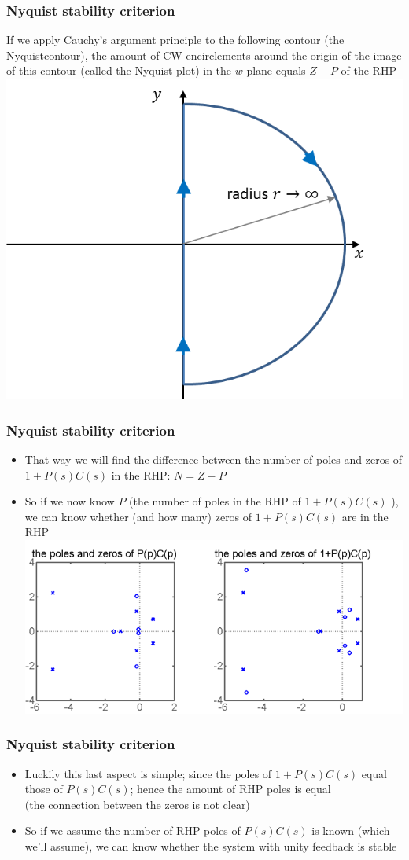 \begin{frame}
\frametitle{Nyquist stability criterion}
 If we apply Cauchy’s argument principle to the following contour (the Nyquistcontour), the amount of CW encirclements around the origin of the image of this contour (called the Nyquist plot) in the $w$-plane equals $Z-P$ of the RHP\\
\includegraphics[width=0.7\linewidth]{Afbeelding8}
\end{frame}

\begin{frame}
\frametitle{Nyquist stability criterion}
\begin{itemize}
\item That way we will find the difference between the number of poles and zeros of $1+P(s)C(s)$ in the RHP: $ N= Z-P $
\item So if we now know $P$ (the number of poles in the RHP of $1+P(s)C(s)$ ), we can know whether (and how many) zeros of $1+P(s)C(s)$ are in the RHP\\
\includegraphics[width=0.8\linewidth]{Afbeelding9}
\end{itemize}
\end{frame}

\begin{frame}
\frametitle{Nyquist stability criterion}
\begin{itemize}
\item Luckily this last aspect is simple; since the poles of $1+P(s)C(s)$ equal those of $P(s)C(s)$; hence the amount of RHP poles is equal \\(the connection between the zeros is not clear)
\item So if we assume the number of RHP poles of $P(s)C(s)$ is known (which we'll assume), we can know whether the system with unity feedback is stable
\end{itemize}
\end{frame}

